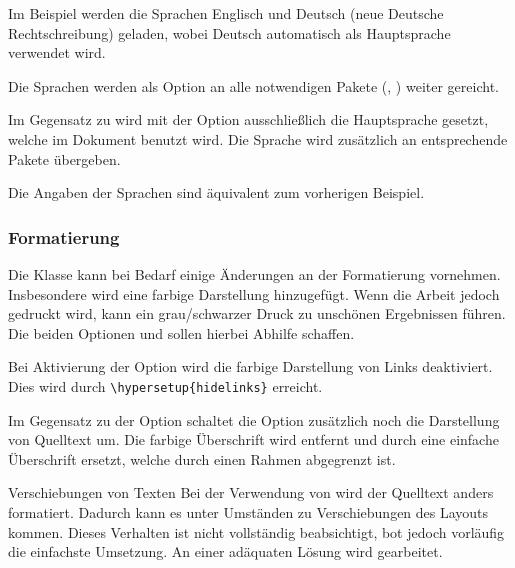 \documentclass[babel=ngerman,highlight=false]{skdoc}
\begin{document}
                Im Beispiel werden die Sprachen Englisch und Deutsch (neue Deutsche Rechtschreibung) geladen, wobei Deutsch automatisch als Hauptsprache verwendet wird.

                Die Sprachen werden als Option an alle notwendigen Pakete (, ) weiter gereicht.\medskip

                Im Gegensatz zu  wird mit der Option ausschließlich die Hauptsprache gesetzt, welche im Dokument benutzt wird. Die Sprache wird zusätzlich an entsprechende Pakete übergeben.



                Die Angaben der Sprachen sind äquivalent zum vorherigen Beispiel.\medskip

            \subsubsection{Formatierung}\label{subsub:format}
                Die Klasse kann bei Bedarf einige Änderungen an der Formatierung vornehmen. Insbesondere wird eine farbige Darstellung hinzugefügt. Wenn die Arbeit jedoch gedruckt wird, kann ein grau/schwarzer Druck zu unschönen Ergebnissen führen. Die beiden Optionen  und  sollen hierbei Abhilfe schaffen.

                Bei Aktivierung der Option wird die farbige Darstellung von Links deaktiviert. Dies wird durch \verb|\hypersetup{hidelinks}| erreicht.\medskip

                Im Gegensatz zu der Option  schaltet die Option zusätzlich noch die Darstellung von Quelltext um. Die farbige Überschrift wird entfernt und durch eine einfache Überschrift ersetzt, welche durch einen Rahmen abgegrenzt ist.

                \begin{warning}{Verschiebungen von Texten}
                    Bei der Verwendung von  wird der Quelltext anders formatiert. Dadurch kann es unter Umständen zu Verschiebungen des Layouts kommen. Dieses Verhalten ist nicht vollständig beabsichtigt, bot jedoch vorläufig die einfachste Umsetzung. An einer adäquaten Lösung wird gearbeitet.
                \end{warning}
\end{document}
